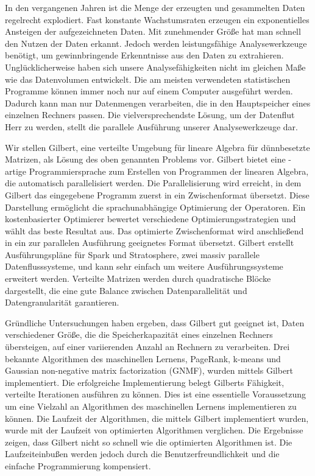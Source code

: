 \clearemptydoublepage
{}
{}	

\vspace*{2cm}
\begin{center}
\end{center}
\vspace{1cm}

In den vergangenen Jahren ist die Menge der erzeugten und gesammelten Daten regelrecht explodiert.
Fast konstante Wachstumsraten erzeugen ein exponentielles Ansteigen der aufgezeichneten Daten.
Mit zunehmender Größe hat man schnell den Nutzen der Daten erkannt.
Jedoch werden leistungsfähige Analysewerkzeuge benötigt, um gewinnbringende Erkenntnisse aus den Daten zu extrahieren.
Unglücklicherweise haben sich unsere Analysefähigkeiten nicht im gleichen Maße wie das Datenvolumen entwickelt.
Die am meisten verwendeten statistischen Programme können immer noch nur auf einem Computer ausgeführt werden.
Dadurch kann man nur Datenmengen verarbeiten, die in den Hauptspeicher eines einzelnen Rechners passen.
Die vielversprechendste Lösung, um der Datenflut Herr zu werden, stellt die parallele Ausführung unserer Analysewerkzeuge dar.

Wir stellen Gilbert, eine verteilte Umgebung für lineare Algebra für dünnbesetzte Matrizen, als Lösung des oben genannten Problems vor.
Gilbert bietet eine \matlab-artige Programmiersprache zum Erstellen von Programmen der linearen Algebra, die automatisch parallelisiert werden.
Die Parallelisierung wird erreicht, in dem Gilbert das eingegebene Programm zuerst in ein Zwischenformat übersetzt.
Diese Darstellung ermöglicht die sprachunabhängige Optimierung der Operatoren.
Ein kostenbasierter Optimierer bewertet verschiedene Optimierungsstrategien und wählt das beste Resultat aus.
Das optimierte Zwischenformat wird anschließend in ein zur parallelen Ausführung geeignetes Format übersetzt.
Gilbert erstellt Ausführungspläne für Spark und Stratosphere, zwei massiv parallele Datenflusssysteme, und kann sehr einfach um weitere Ausführungssysteme erweitert werden. 
Verteilte Matrizen werden durch quadratische Blöcke dargestellt, die eine gute Balance zwischen Datenparallelität und Datengranularität garantieren.

Gründliche Untersuchungen haben ergeben, dass Gilbert gut geeignet ist, Daten verschiedener Größe, die die Speicherkapazität eines einzelnen Rechners übersteigen, auf einer variierenden Anzahl an Rechnern zu verarbeiten.
Drei bekannte Algorithmen des maschinellen Lernens, PageRank, k-means und Gaussian non-negative matrix factorization (GNMF), wurden mittels Gilbert implementiert.
Die erfolgreiche Implementierung belegt Gilberts Fähigkeit, verteilte Iterationen ausführen zu können.
Dies ist eine essentielle Voraussetzung um eine Vielzahl an Algorithmen des maschinellen Lernens implementieren zu können.
Die Laufzeit der Algorithmen, die mittels Gilbert implementiert wurden, wurde mit der Laufzeit von optimierten Algorithmen verglichen.
Die Ergebnisse zeigen, dass Gilbert nicht so schnell wie die optimierten Algorithmen ist.
Die Laufzeiteinbußen werden jedoch durch die Benutzerfreundlichkeit und die einfache Programmierung kompensiert.
